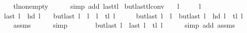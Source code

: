 \begin{isabellebody}
\ \ \ \ \isamarkupfalse%
\ tl{\isacharunderscore}{\kern0pt}non{\isacharunderscore}{\kern0pt}empty\isanewline
\ \ \ \ \isamarkupfalse%
\ {\isacharparenleft}{\kern0pt}simp\ add{\isacharcolon}{\kern0pt}\ last{\isacharunderscore}{\kern0pt}tl{\isacharparenright}{\kern0pt}\isanewline
{}\isamarkupfalse%
%
\endisatagproof
{\isafoldproof}%
%
\isadelimproof
\isanewline
%
\endisadelimproof
%
\isadeliminvisible
\isanewline
%
\endisadeliminvisible
%
\isataginvisible
{}\isamarkupfalse%
\ butlast{\isacharunderscore}{\kern0pt}tl{\isacharunderscore}{\kern0pt}conv{\isacharcolon}{\kern0pt}\isanewline
\ \ \ {\isachardoublequoteopen}l{}\ {\isasymnoteq}\ {\isacharbrackleft}{\kern0pt}{\isacharbrackright}{\kern0pt}{\isachardoublequoteclose}\isanewline
\ \ \ {\isachardoublequoteopen}l{}\ {\isasymnoteq}\ {\isacharbrackleft}{\kern0pt}{\isacharbrackright}{\kern0pt}{\isachardoublequoteclose}\isanewline
\ \ \ {\isachardoublequoteopen}last\ l{}\ {\isacharequal}{\kern0pt}\ hd\ l{}{\isachardoublequoteclose}\isanewline
\ \ \ {\isachardoublequoteopen}butlast\ l{}\ {\isacharat}{\kern0pt}\ l{}\ {\isacharequal}{\kern0pt}\ l{}\ {\isacharat}{\kern0pt}\ tl\ l{}{\isachardoublequoteclose}%
\endisataginvisible
{\isafoldinvisible}%
%
\isadeliminvisible
\isanewline
%
\endisadeliminvisible
%
\isadelimproof
%
\endisadelimproof
%
\isatagproof
{}\isamarkupfalse%
\ {\isacharminus}{\kern0pt}\isanewline
\ \ \isamarkupfalse%
\ {\isachardoublequoteopen}butlast\ l{}\ {\isacharat}{\kern0pt}\ l{}\ {\isacharequal}{\kern0pt}\ butlast\ l{}\ {\isacharat}{\kern0pt}\ hd\ l{}\ {\isacharhash}{\kern0pt}\ tl\ l{}{\isachardoublequoteclose}\isanewline
\ \ \ \ \isamarkupfalse%
\ assms{\isacharparenleft}{\kern0pt}{}{\isacharparenright}{\kern0pt}\isanewline
\ \ \ \ \isamarkupfalse%
\ simp\isanewline
\ \ \isamarkupfalse%
\ \isamarkupfalse%
\ {\isachardoublequoteopen}{\isachardot}{\kern0pt}{\isachardot}{\kern0pt}{\isachardot}{\kern0pt}\ {\isacharequal}{\kern0pt}\ butlast\ l{}\ {\isacharat}{\kern0pt}\ last\ l{}\ {\isacharhash}{\kern0pt}\ tl\ l{}{\isachardoublequoteclose}\isanewline
\ \ \ \ \isamarkupfalse%
\ {\isacharparenleft}{\kern0pt}simp\ add{\isacharcolon}{\kern0pt}\ assms{\isacharparenleft}{\kern0pt}{}{\isacharparenright}{\kern0pt}{\isacharparenright}{\kern0pt}\isanewline

\end{isabellebody}
